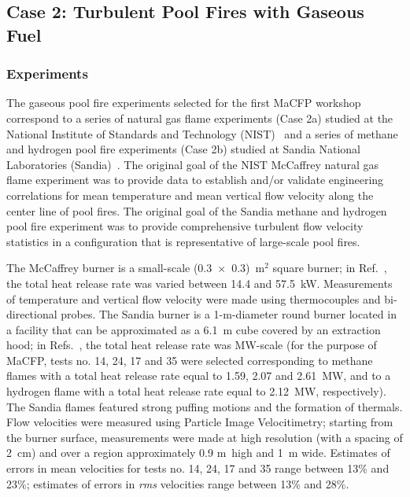 
\subsection{Case 2: Turbulent Pool Fires with Gaseous Fuel} \label{sec:gaseous_pool_fires}

\subsubsection{Experiments}

The gaseous pool fire experiments selected for the first MaCFP workshop correspond to a series of natural gas flame experiments (Case 2a) studied at the National Institute of Standards and Technology (NIST)~\cite{Case2a_EXP} and a series of methane and hydrogen pool fire experiments (Case 2b) studied at Sandia National Laboratories (Sandia)~\cite{Case2b_EXP_CH4,Case2b_EXP_H2}. The original goal of the NIST McCaffrey natural gas flame experiment was to provide data to establish and/or validate engineering correlations for mean temperature and mean vertical flow velocity along the center line of pool fires. The original goal of the Sandia methane and hydrogen pool fire experiment was to provide comprehensive turbulent flow velocity statistics in a configuration that is representative of large-scale pool fires.

The McCaffrey burner is a small-scale (0.3~$\times$~0.3)~m$^2$ square burner; in Ref.~\cite{Case2a_EXP}, the total heat release rate was varied between 14.4 and 57.5~kW. Measurements of temperature and vertical flow velocity were made using thermocouples and bi-directional probes. The Sandia burner is a 1-m-diameter round burner located in a facility that can be approximated as a 6.1~m cube covered by an extraction hood; in Refs.~\cite{Case2b_EXP_CH4,Case2b_EXP_H2}, the total heat release rate was MW-scale (for the purpose of MaCFP, tests no. 14, 24, 17 and 35 were selected corresponding to methane flames with a total heat release rate equal to 1.59, 2.07 and 2.61~MW, and to a hydrogen flame with a total heat release rate equal to 2.12~MW, respectively). The Sandia flames featured strong puffing motions and the formation of thermals. Flow velocities were measured using Particle Image Velocitimetry; starting from the burner surface, measurements were made at high resolution (with a spacing of 2~cm) and over a region approximately 0.9 m~high and 1~m wide. Estimates of errors in mean velocities for tests no. 14, 24, 17 and 35 range between 13\% and 23\%; estimates of errors in {\it rms} velocities range between 13\% and 28\%.

